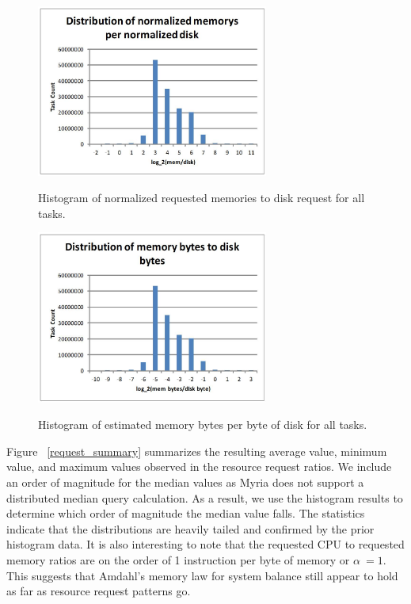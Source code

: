 \documentclass{sig-alternate}
\begin{document}
\begin{figure}[t]
\centering
\includegraphics[width=3in]{../figures/req_mem_disk.jpg}
\label{req_mem_disk}
\caption{Histogram of normalized requested memories to disk request for all tasks.}
\end{figure}

\begin{figure}[t]
\centering
\includegraphics[width=3in]{../figures/est_req_mem_disk.jpg}
\label{est_req_mem_disk}
\caption{Histogram of estimated memory bytes per byte of disk for all tasks.}
\end{figure}

Figure ~\ref{request_summary} summarizes the resulting average value, minimum value, and maximum values observed in the resource request ratios.
We include an order of magnitude for the median values as Myria does not support a distributed median query calculation.
As a result, we use the histogram results to determine which order of magnitude the median value falls.
The statistics indicate that the distributions are heavily tailed and confirmed by the prior histogram data.
It is also interesting to note that the requested CPU to requested memory ratios are on the order of 1 instruction per byte of memory or $\alpha ~= 1$.
This suggests that Amdahl's memory law for system balance still appear to hold as far as resource request patterns go.
\end{document}
